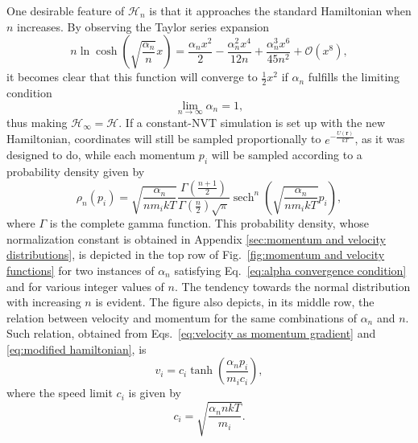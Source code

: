 \documentclass[
aip,
jcp,
reprint,
]{revtex4-1}
\DeclareMathOperator\sech{sech}
\newcommand{\vt}[1]{\boldsymbol{\mathbf{#1}}}          %
\newcommand{\nn}{n}
\begin{document}
One desirable feature of $\mathcal{H}_\nn$ is that it approaches the standard Hamiltonian when $\nn$ increases.
By observing the Taylor series expansion
\begin{equation*}
\nn \ln \cosh\left(\sqrt{\frac{\alpha_\nn}{\nn}} x\right) = \frac{\alpha_\nn x^2}{2} - \frac{\alpha_\nn^2 x^4}{12 \nn} + \frac{\alpha_\nn^3 x^6}{45 \nn^2} + \mathcal{O}(x^8),
\end{equation*}
it becomes clear that this function will converge to $\frac{1}{2}x^2$ if $\alpha_\nn$ fulfills the limiting condition
\begin{equation}
\label{eq:alpha convergence condition}
\lim\limits_{\nn \to \infty} \alpha_\nn = 1,
\end{equation}
thus making $\mathcal{H}_\infty = \mathcal{H}$.
If a constant-NVT simulation is set up with the new Hamiltonian, coordinates will still be sampled proportionally to $e^{-\frac{U(\vt r)}{kT}}$, as it was designed to do, while each momentum $p_i$ will be sampled according to a probability density given by
\begin{equation}
\label{eq:momentum distribution}
\rho_\nn(p_i) = \sqrt{\frac{\alpha_\nn}{\nn m_i k T}} \frac{\Gamma\left(\frac{\nn+1}{2}\right)}{\Gamma\left(\frac{\nn}{2}\right) \sqrt{\pi}} \sech^\nn\left(\sqrt{\frac{\alpha_\nn}{\nn m_i k T}} p_i\right),
\end{equation}
where $\Gamma$ is the complete gamma function.
This probability density, whose normalization constant is obtained in Appendix \ref{sec:momentum and velocity distributions}, is depicted in the top row of Fig.~\ref{fig:momentum and velocity functions} for two instances of $\alpha_\nn$ satisfying Eq.~\eqref{eq:alpha convergence condition} and for various integer values of $\nn$.
The tendency towards the normal distribution with increasing $\nn$ is evident.
The figure also depicts, in its middle row, the relation between velocity and momentum for the same combinations of $\alpha_\nn$ and $\nn$.
Such relation, obtained from Eqs.~\eqref{eq:velocity as momentum gradient} and \eqref{eq:modified hamiltonian}, is
\begin{equation}
	\label{eq:velocity definition}
	v_i = c_i \tanh\left(\frac{\alpha_\nn p_i}{m_i c_i}\right),
\end{equation}
	where the speed limit $c_i$ is given by
\begin{equation}
	\label{eq:speed limit definition}
	c_i = \sqrt{\frac{\alpha_\nn \nn k T}{m_i}}.
\end{equation}
\end{document}

